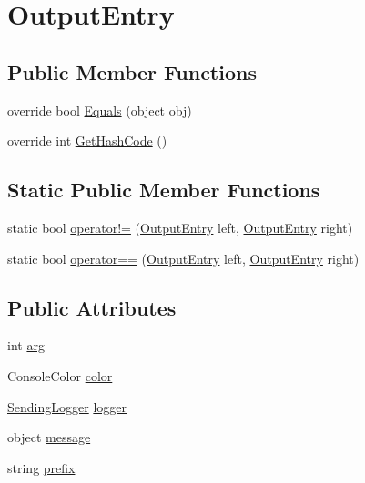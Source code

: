 \hypertarget{structOTA_1_1Logging_1_1OutputEntry}{}\section{Output\+Entry}
\label{structOTA_1_1Logging_1_1OutputEntry}
\subsection*{Public Member Functions}
\begin{DoxyCompactItemize}
\item 
override bool \hyperlink{structOTA_1_1Logging_1_1OutputEntry_aadf763f0213fc2f3875230b06bb0b6cf}{Equals} (object obj)
\item 
override int \hyperlink{structOTA_1_1Logging_1_1OutputEntry_a77e1afa2b6dee1ed3640da81d7407b42}{Get\+Hash\+Code} ()
\end{DoxyCompactItemize}
\subsection*{Static Public Member Functions}
\begin{DoxyCompactItemize}
\item 
static bool \hyperlink{structOTA_1_1Logging_1_1OutputEntry_a5a4f70576d97b679fb1b910a00637220}{operator!=} (\hyperlink{structOTA_1_1Logging_1_1OutputEntry}{Output\+Entry} left, \hyperlink{structOTA_1_1Logging_1_1OutputEntry}{Output\+Entry} right)
\item 
static bool \hyperlink{structOTA_1_1Logging_1_1OutputEntry_aaf9d54ebfd2cf024760fd3c3374d4a3a}{operator==} (\hyperlink{structOTA_1_1Logging_1_1OutputEntry}{Output\+Entry} left, \hyperlink{structOTA_1_1Logging_1_1OutputEntry}{Output\+Entry} right)
\end{DoxyCompactItemize}
\subsection*{Public Attributes}
\begin{DoxyCompactItemize}
\item 
int \hyperlink{structOTA_1_1Logging_1_1OutputEntry_af09bff4320de23f28f0d261c3b124d6b}{arg}
\item 
Console\+Color \hyperlink{structOTA_1_1Logging_1_1OutputEntry_a7424a96a22ffc0bb80b9e3949147d1e7}{color}
\item 
\hyperlink{namespaceOTA_1_1Logging_a489c780cb72d9452216c06b7a0eec2a6}{Sending\+Logger} \hyperlink{structOTA_1_1Logging_1_1OutputEntry_a129e47537a8d6de79ffb9519da4f151d}{logger}
\item 
object \hyperlink{structOTA_1_1Logging_1_1OutputEntry_aaccbdd0ebbc076a6e743906a1d34a9c3}{message}
\item 
string \hyperlink{structOTA_1_1Logging_1_1OutputEntry_ab7b6fb49a3a178b1628690ad0f00927d}{prefix}
\end{DoxyCompactItemize}


